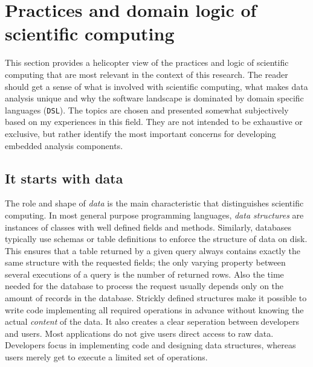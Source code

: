 
\section{Practices and domain logic of scientific computing}


This section provides a helicopter view of the practices and logic of scientific computing that are most relevant in the context of this research. The reader should get a sense of what is involved with scientific computing, what makes data analysis unique and why the software landscape is dominated by domain specific languages (\texttt{DSL}). The topics are chosen and presented somewhat subjectively based on my experiences in this field. They are not intended to be exhaustive or exclusive, but rather identify the most important concerns for developing embedded analysis components. 

\subsection{It starts with data}

The role and shape of \emph{data} is the main characteristic that distinguishes scientific computing. In most general purpose programming languages, \emph{data structures} are instances of classes with well defined fields and methods. Similarly, databases typically use schemas or table definitions to enforce the structure of data on disk. This ensures that a table returned by a given \SQL query always contains exactly the same structure with the requested fields; the only varying property between several executions of a query is the number of returned rows. Also the time needed for the database to process the request usually depends only on the amount of records in the database.
Strickly defined structures make it possible to write code implementing all required operations in advance without knowing the actual \emph{content} of the data. It also creates a clear seperation between developers and users. Most applications do not give users direct access to raw data. Developers focus in implementing code and designing data structures, whereas users merely get to execute a limited set of operations.

